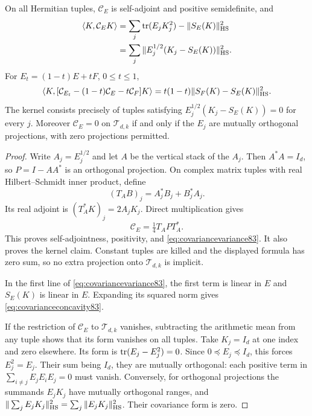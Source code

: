\begin{lemma}
\label{lem:covarianceidentities83}
On all Hermitian tuples, $\mathcal C_E$ is self-adjoint and positive
semidefinite, and
\begin{align}
 \langle K,\mathcal C_EK\rangle
 &=\sum_j\operatorname{tr}(E_jK_j^2)-\|S_E(K)\|_{\rm HS}^2\notag\\
 &=\sum_j\|E_j^{1/2}(K_j-S_E(K))\|_{\rm HS}^2.
                                      \label{eq:covariancevariance83}
\end{align}
For $E_t=(1-t)E+tF$, $0\le t\le1$,
\begin{equation}\label{eq:covarianceconcavity83}
 \langle K,[\mathcal C_{E_t}-(1-t)\mathcal C_E-t\mathcal C_F]K\rangle
 =t(1-t)\|S_F(K)-S_E(K)\|_{\rm HS}^2.
\end{equation}
The kernel consists precisely of tuples satisfying
$E_j^{1/2}(K_j-S_E(K))=0$ for every $j$.
Moreover $\mathcal C_E=0$ on $\mathcal T_{d,k}$ if and only if the
$E_j$ are mutually orthogonal projections, with zero projections
permitted.
\end{lemma}
\begin{proof}
Write $A_j=E_j^{1/2}$ and let $A$ be the vertical stack of the $A_j$.
Then $A^*A=I_d$, so $P=I-AA^*$ is an orthogonal projection.  On
complex matrix tuples with real Hilbert--Schmidt inner product,
define
\[
 (T_AB)_j=A_j^*B_j+B_j^*A_j.
\]
Its real adjoint is $(T_A^*K)_j=2A_jK_j$.  Direct multiplication gives
\begin{equation}\label{eq:covariancefactor83}
 \mathcal C_E=\tfrac14 T_APT_A^*.
\end{equation}
This proves self-adjointness, positivity, and
\eqref{eq:covariancevariance83}.  It also proves the kernel claim.
Constant tuples are killed and the displayed formula has zero sum,
so no extra projection onto $\mathcal T_{d,k}$ is implicit.

In the first line of \eqref{eq:covariancevariance83}, the first term
is linear in $E$ and $S_E(K)$ is linear in $E$.  Expanding its squared
norm gives \eqref{eq:covarianceconcavity83}.

If the restriction of $\mathcal C_E$ to $\mathcal T_{d,k}$ vanishes,
subtracting the arithmetic mean from any tuple shows that its form
vanishes on all tuples.  Take $K_j=I_d$ at one index and zero
elsewhere.  Its form is $\operatorname{tr}(E_j-E_j^2)=0$.  Since $0\preceq E_j
\preceq I_d$, this forces $E_j^2=E_j$.  Their sum being $I_d$, they
are mutually orthogonal: each positive term in
$\sum_{i\ne j}E_jE_iE_j=0$ must vanish.  Conversely, for orthogonal
projections the summands $E_jK_j$ have mutually orthogonal ranges,
and $\|\sum_jE_jK_j\|_{\rm HS}^2=\sum_j\|E_jK_j\|_{\rm HS}^2$.
Their covariance form is zero.
\end{proof}


